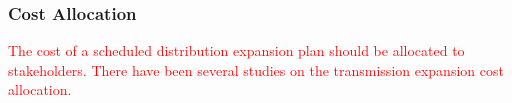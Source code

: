 \documentclass[journal]{IEEEtran} %
\begin{document}
\vspace{1in}







\subsubsection{Cost Allocation}
\textcolor{red}{The cost of a scheduled distribution expansion plan should be allocated to stakeholders. There have been several studies on the transmission expansion cost allocation.}



\vspace{1in}









\end{document}
